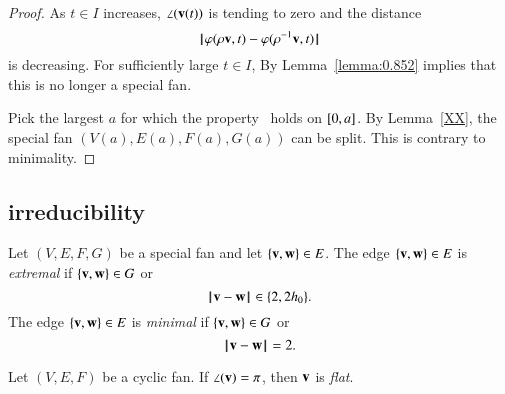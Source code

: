 \begin{proof}
As $t\in I$ increases, $\angle({\mathbf v}(t))$ is tending to zero and the distance
$$
{\hskip0.1em|\hskip-0.15em|\hskip0.1em} \varphi(\rho {\mathbf v},t) - \varphi(\rho^{-1} {\mathbf v},t){\hskip0.1em|\hskip-0.15em|\hskip0.1em}
$$
is decreasing.
For sufficiently large $t\in I$, 
By Lemma~\ref{lemma:0.852} implies that this is no longer a special fan.

Pick the largest $a$ for which the property~ holds on
$[0,a]$.
By Lemma~\ref{XX}, the special fan $(V(a),E(a),F(a),G(a))$ can be split.
This is contrary to minimality.
\end{proof}

\subsection{irreducibility}

\begin{definition} Let $(V,E,F,G)$ be a special fan and let $\{{\mathbf v},{\mathbf w}\}\in E$.
The edge $\{{\mathbf v},{\mathbf w}\}\in E$ is {\it extremal} if $\{{\mathbf v},{\mathbf w}\}\in G$ or
$$
{\hskip0.1em|\hskip-0.15em|\hskip0.1em}{\mathbf v} - {\mathbf w}{\hskip0.1em|\hskip-0.15em|\hskip0.1em}\in\{2,2{h_0}\}.
$$
The edge $\{{\mathbf v},{\mathbf w}\}\in E$ is {\it minimal} if $\{{\mathbf v},{\mathbf w}\}\in G$ or
$$
{\hskip0.1em|\hskip-0.15em|\hskip0.1em}{\mathbf v} - {\mathbf w}{\hskip0.1em|\hskip-0.15em|\hskip0.1em}=2.
$$
\end{definition}

\begin{definition} Let $(V,E,F)$ be a cyclic fan.
If $\angle({\mathbf v})=\pi$, then ${\mathbf v}$ is {\it flat}.
\end{definition}

